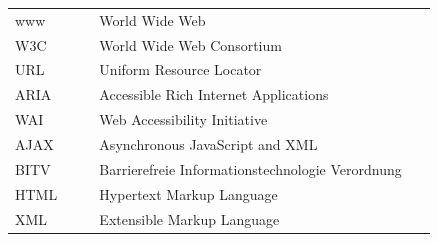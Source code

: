 \documentclass[a4paper,bibtotoc,oneside]{scrbook}
\begin{document}
\hspace{-17mm}\begin{tabular}{>{\raggedleft}p{0.2\linewidth} p{0.75\linewidth} p{0.1\linewidth}}

www & World Wide Web\\
W3C & World Wide Web Consortium\\
URL & Uniform Resource Locator\\
ARIA & Accessible Rich Internet Applications\\
WAI & Web Accessibility Initiative\\
AJAX & Asynchronous JavaScript and XML\\
BITV & Barrierefreie  Informationstechnologie Verordnung\\
HTML & Hypertext Markup Language\\
XML & Extensible Markup Language\\
\end{tabular}


\end{document}

